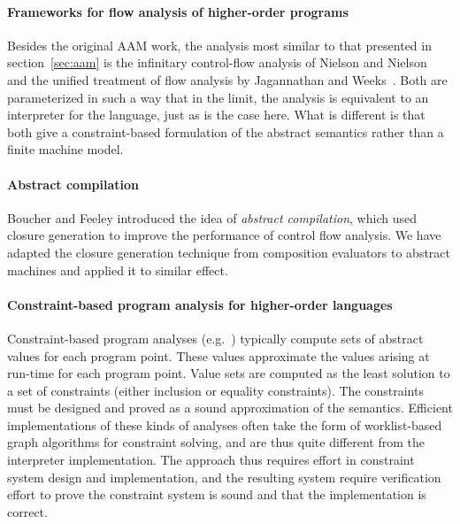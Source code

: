 \documentclass[preprint,onecolumn,9pt]{sigplanconf} %
\begin{document}
\paragraph{Frameworks for flow analysis of higher-order programs}

Besides the original AAM work, the analysis most similar to that
presented in section~\ref{sec:aam} is the infinitary control-flow
analysis of Nielson and Nielson~\cite{dvanhorn:nielson-nielson-popl97}
and the unified treatment of flow analysis by Jagannathan and
Weeks~\cite{dvanhorn:jagannathan-weeks-popl95}.  Both are
parameterized in such a way that in the limit, the analysis is
equivalent to an interpreter for the language, just as is the case
here.  What is different is that both give a constraint-based
formulation of the abstract semantics rather than a finite machine
model.

\paragraph{Abstract compilation}

Boucher and Feeley \cite{dvanhorn:Boucher1996Abstract} introduced the
idea of \emph{abstract compilation}, which used closure generation
\cite{dvanhorn:Feeley1987Using} to improve the performance of control
flow analysis.  We have adapted the closure generation technique from
composition evaluators to abstract machines and applied it to similar
effect.

\paragraph{Constraint-based program analysis for higher-order languages}

Constraint-based program analyses
(e.g.~\cite{dvanhorn:nielson-nielson-popl97,dvanhorn:wright-jagannathan-toplas98,dvanhorn:Meunier2006Modular})
typically compute sets of abstract values for each program point.
These values approximate the values arising at run-time for each
program point.  Value sets are computed as the least solution to a set
of constraints (either inclusion or equality constraints).  The
constraints must be designed and proved as a sound approximation of
the semantics.  Efficient implementations of these kinds of analyses
often take the form of worklist-based graph algorithms for constraint
solving, and are thus quite different from the interpreter
implementation.  The approach thus requires effort in constraint
system design and implementation, and the resulting system require
verification effort to prove the constraint system is sound and that
the implementation is correct.
\end{document}
